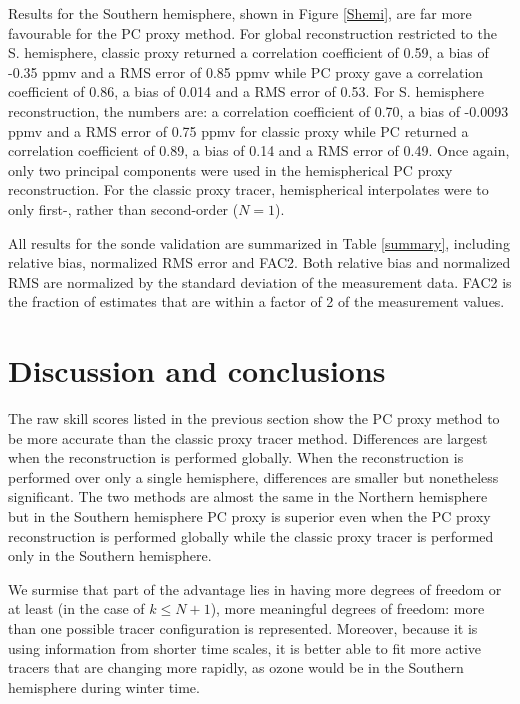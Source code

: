 Results for the Southern hemisphere, shown in Figure \ref{Shemi}, are far more 
favourable for the PC proxy method.
For global reconstruction restricted to the S. hemisphere, classic proxy
returned a correlation coefficient of 0.59, a bias of -0.35 ppmv and a RMS error 
of 0.85 ppmv while PC proxy gave a correlation coefficient of 0.86, a bias of 0.014
and a RMS error of 0.53.
For S. hemisphere reconstruction, the numbers are: a correlation coefficient of 0.70,
a bias of -0.0093 ppmv and a RMS error of 0.75 ppmv for classic proxy
while PC returned a correlation coefficient of 0.89, a bias of 0.14 and a RMS error
of 0.49.
Once again, only two principal components were used in the hemispherical PC
proxy reconstruction.
For the classic proxy tracer, hemispherical interpolates were to only first-, rather than
second-order ($N=1$).

All results for the sonde validation are summarized in Table \ref{summary},
including relative bias, normalized RMS error and FAC2. 
Both relative bias and normalized RMS are normalized by the standard 
deviation of the measurement data.
FAC2 is the fraction of estimates that are within a factor of 2 of the 
measurement values.


\section{Discussion and conclusions}

The raw skill scores listed in the previous section show the PC proxy method
to be more accurate than the classic proxy tracer method. 
Differences are largest when the reconstruction is performed globally.
When the reconstruction is performed over only a single hemisphere,
differences are smaller but nonetheless significant.
The two methods are almost the same in the Northern hemisphere but in 
the Southern hemisphere PC proxy is superior even when the PC proxy
reconstruction is performed globally while the classic proxy tracer is 
performed only in the Southern hemisphere.

We surmise that part of the advantage lies in having more degrees of freedom
or at least (in the case of $k \le N+1$), more meaningful degrees of freedom:
more than one possible tracer configuration is represented.
Moreover, because it is using information from shorter time scales, it
is better able to fit more active tracers that are changing more rapidly,
as ozone would be in the Southern hemisphere during winter time.

